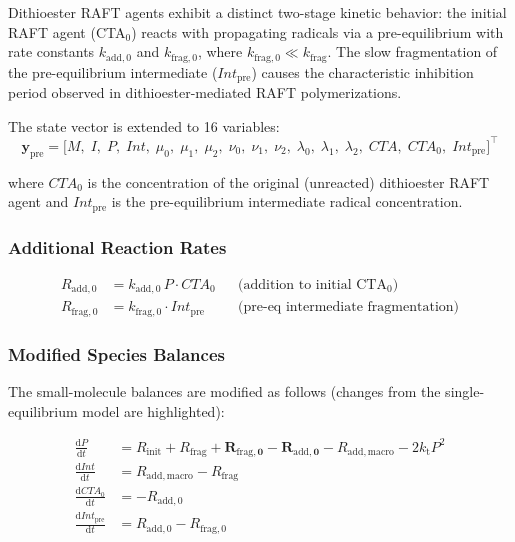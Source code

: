 \documentclass[journal=mamobx,manuscript=suppinfo]{achemso}
\begin{document}
Dithioester RAFT agents exhibit a distinct two-stage kinetic behavior: the
initial RAFT agent (CTA$_0$) reacts with propagating radicals via a
pre-equilibrium with rate constants $k_{\mathrm{add},0}$ and
$k_{\mathrm{frag},0}$, where $k_{\mathrm{frag},0} \ll k_{\mathrm{frag}}$.
The slow fragmentation of the pre-equilibrium intermediate ($\mathit{Int}_{\mathrm{pre}}$)
causes the characteristic inhibition period observed in dithioester-mediated
RAFT polymerizations.

The state vector is extended to 16 variables:
\begin{equation}
\mathbf{y}_{\mathrm{pre}} = \bigl[
  M,\; I,\; P,\; \mathit{Int},\;
  \mu_0,\; \mu_1,\; \mu_2,\;
  \nu_0,\; \nu_1,\; \nu_2,\;
  \lambda_0,\; \lambda_1,\; \lambda_2,\;
  \mathit{CTA},\;
  \mathit{CTA}_0,\; \mathit{Int}_{\mathrm{pre}}
\bigr]^\top
\end{equation}

\noindent where $\mathit{CTA}_0$ is the concentration of the original
(unreacted) dithioester RAFT agent and $\mathit{Int}_{\mathrm{pre}}$ is the
pre-equilibrium intermediate radical concentration.

\subsubsection{Additional Reaction Rates}

\begin{align}
  R_{\mathrm{add},0}  &= k_{\mathrm{add},0} \, P \cdot \mathit{CTA}_0
    & &\text{(addition to initial CTA$_0$)} \label{eq:R_add0} \\
  R_{\mathrm{frag},0} &= k_{\mathrm{frag},0} \cdot \mathit{Int}_{\mathrm{pre}}
    & &\text{(pre-eq intermediate fragmentation)} \label{eq:R_frag0}
\end{align}

\subsubsection{Modified Species Balances}

The small-molecule balances are modified as follows (changes from the
single-equilibrium model are highlighted):

\begin{align}
  \frac{\mathrm{d}P}{\mathrm{d}t}
    &= R_{\mathrm{init}} + R_{\mathrm{frag}} + \boldsymbol{R_{\mathrm{frag},0}}
       - \boldsymbol{R_{\mathrm{add},0}} - R_{\mathrm{add,macro}}
       - 2 k_{\mathrm{t}} P^2
    \label{eq:dP_pre} \\[6pt]
  \frac{\mathrm{d}\mathit{Int}}{\mathrm{d}t}
    &= R_{\mathrm{add,macro}} - R_{\mathrm{frag}}
    \label{eq:dInt_pre} \\[6pt]
  \frac{\mathrm{d}\mathit{CTA}_0}{\mathrm{d}t}
    &= -R_{\mathrm{add},0}
    \label{eq:dCTA0} \\[6pt]
  \frac{\mathrm{d}\mathit{Int}_{\mathrm{pre}}}{\mathrm{d}t}
    &= R_{\mathrm{add},0} - R_{\mathrm{frag},0}
    \label{eq:dIntpre}
\end{align}
\end{document}

